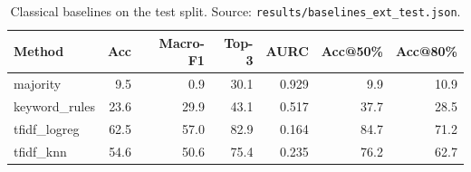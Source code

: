 \begin{table}[t]\centering
\small
\caption{Classical baselines on the test split. Source: \texttt{results/baselines\_ext\_test.json}.}
\label{tab:baselines-test}
\begin{tabular}{lrrrrrr}
\toprule
Method & Acc & Macro-F1 & Top-3 & AURC & Acc@50\% & Acc@80\% \\
\midrule
majority & 9.5 & 0.9 & 30.1 & 0.929 & 9.9 & 10.9 \\
keyword\_rules & 23.6 & 29.9 & 43.1 & 0.517 & 37.7 & 28.5 \\
tfidf\_logreg & 62.5 & 57.0 & 82.9 & 0.164 & 84.7 & 71.2 \\
tfidf\_knn & 54.6 & 50.6 & 75.4 & 0.235 & 76.2 & 62.7 \\
\bottomrule
\end{tabular}
\end{table}
